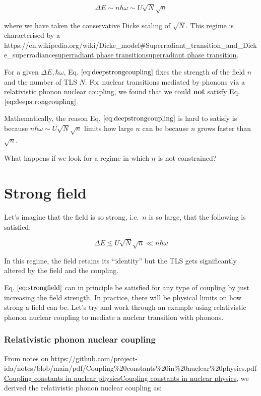 \documentclass[
]{article}
\let\oldhref\href
\renewcommand{\href}[2]{\ifx#1\urlprefix\oldhref{#1}{#2}\else\uline{\oldhref{#1}{#2}}\fi}
\renewcommand{\[}{\begin{equation}}
\renewcommand{\]}{\end{equation}}
\begin{document}
\[
\Delta E \sim n\hbar\omega \sim U\sqrt{N}\sqrt{n}
\label{eq:deepstrongcoupling}
\]

where we have taken the conservative Dicke scaling of \(\sqrt{N}\). This
regime is characterised by a
\href{https://en.wikipedia.org/wiki/Dicke_model\#Superradiant_transition_and_Dicke_superradiance}{superradiant
phase transition}.

For a given \(\Delta E, \hbar\omega\), Eq.
\(\ref{eq:deepstrongcoupling}\) fixes the strength of the field \(n\)
and the number of TLS \(N\). For nuclear transitions mediated by phonons
via a relativistic phonon nuclear coupling, we found that we could
\textbf{not} satisfy Eq. \(\ref{eq:deepstrongcoupling}\).

Mathematically, the reason Eq. \(\ref{eq:deepstrongcoupling}\) is hard
to satisfy is because \(n\hbar\omega \sim U\sqrt{N}\sqrt{n}\) limits how
large \(n\) can be because \(n\) grows faster than \(\sqrt{n}\).

What happens if we look for a regime in which \(n\) is not constrained?

\section{Strong field}\label{strong-field}

Let's imagine that the field is so strong, i.e.~\(n\) is so large, that
the following is satisfied:

\[
\Delta E \lesssim U\sqrt{N}\sqrt{n} \ll n\hbar \omega
\label{eq:strongfield}
\]

In this regime, the field retains its ``identity'' but the TLS gets
significantly altered by the field and the coupling.

Eq. \(\ref{eq:strongfield}\) can in principle be satisfied for any type
of coupling by just increasing the field strength. In practice, there
will be physical limits on how strong a field can be. Let's try and work
through an example using relativistic phonon nuclear coupling to mediate
a nuclear transition with phonons.

\subsubsection{Relativistic phonon nuclear
coupling}\label{relativistic-phonon-nuclear-coupling}

From notes on
\href{https://github.com/project-ida/notes/blob/main/pdf/Coupling\%20constants\%20in\%20nuclear\%20physics.pdf}{Coupling
constants in nuclear physics}, we derived the relativistic phonon
nuclear coupling as:
\end{document}
